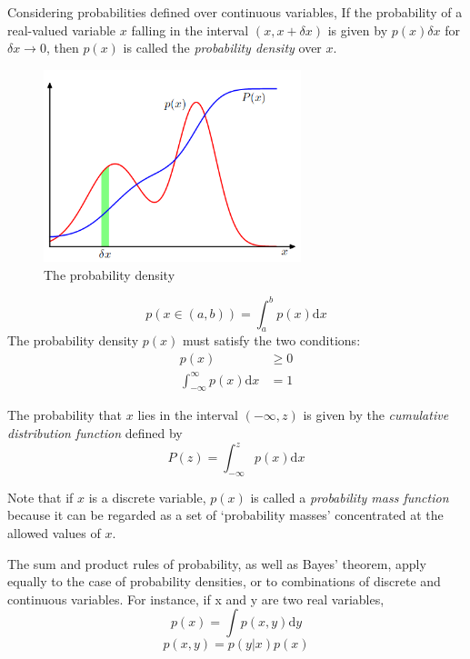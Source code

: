 \documentclass[5p,sort&compress]{elsarticle}
\begin{document}
Considering probabilities defined over continuous variables, If the probability of a real-valued variable $x$ falling in the interval $(x, x+ \delta x)$ is given by $p(x) \delta x$ for $\delta x \to 0$, then $p(x)$ is called the \textit{probability density} over $x$.

 \begin{figure}[h]
     \centering
     \includegraphics[width = 7.5cm]{figure/probability_density.png}
     \caption{The  probability density}
     \label{fig:1.12}
 \end{figure}

\begin{equation}
p(x \in(a, b))=\int_{a}^{b} p(x) \mathrm{d} x
\end{equation}
The probability density $p(x)$ must satisfy the two conditions:
\begin{equation}
\begin{aligned} p(x) & \geqslant 0 \\ \int_{-\infty}^{\infty} p(x) \mathrm{d} x &=1 \end{aligned}
\end{equation}

The probability that $x$ lies in the interval $(- \infty, z)$ is given by the \textit{cumulative distribution function} defined by
\begin{equation}
P(z)=\int_{-\infty}^{z} p(x) \mathrm{d} x
\end{equation}

Note that if $x$ is a discrete variable, $p(x)$ is called a \textit{probability mass function} because it can be regarded as a set of `probability masses' concentrated at the allowed values of $x$.

The sum and product rules of probability, as well as Bayes' theorem, apply equally to the case of probability densities, or to combinations of discrete and continuous variables. For instance, if x and y are two real variables,
\begin{equation}
p(x)=\int p(x, y) \mathrm{d} y
\end{equation}
\begin{equation}
p(x, y)=p(y | x) p(x)
\end{equation}
\end{document}
